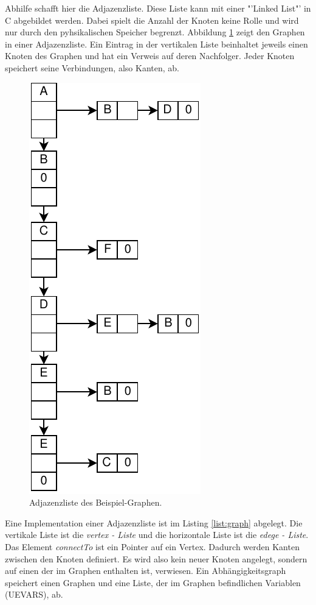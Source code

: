 Abhilfe schafft hier die Adjazenzliste. Diese Liste kann mit einer "'Linked List"' in C abgebildet werden. Dabei spielt die Anzahl der Knoten keine Rolle und wird nur durch den pyhsikalischen Speicher begrenzt. Abbildung \ref{fig:adjacencelist} zeigt den Graphen in einer Adjazenzliste. Ein Eintrag in der vertikalen Liste beinhaltet jeweils einen Knoten des Graphen und hat ein Verweis auf deren Nachfolger. Jeder Knoten speichert seine Verbindungen, also Kanten, ab. 
\begin{figure}[h]
	\centering
	\includegraphics[scale=0.85]{images/adjacencelist.pdf} 
	\caption{Adjazenzliste des Beispiel-Graphen.}
	\label{fig:adjacencelist}
\end{figure}
Eine Implementation einer Adjazenzliste ist im Listing \ref{list:graph} abgelegt. Die vertikale Liste ist die \textit{vertex - Liste} und die horizontale Liste ist die \textit{edege - Liste}. Das Element \textit{connectTo} ist ein Pointer auf ein Vertex. Dadurch werden Kanten zwischen den Knoten definiert. Es wird also kein neuer Knoten angelegt, sondern auf einen der im Graphen enthalten ist, verwiesen. Ein Abhängigkeitsgraph speichert einen Graphen und eine Liste, der im Graphen befindlichen Variablen (UEVARS), ab.
